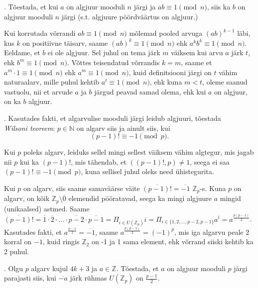 \documentclass[a4paper, 10pt]{article}
\newcommand{\Z}{\mathbb{Z}}
\newcommand{\N}{\mathbb{N}}
\newcommand{\w}{\overline}
\begin{document}
\bigskip

. T\~oestada, et kui $a$ on algjuur mooduli $n$ j\"argi ja $ab\equiv 1\pmod{n}$, siis ka $b$ on algjuur mooduli $n$ j\"argi (s.t. algjuure pöördväärtus on algjuur.)

\bigskip
Kui korrutada võrrandi $ab\equiv1\pmod n$ mõlemad pooled arvuga $(ab)^{k-1}$ läbi, kus $k$ on positiivne täisarv, saame $(ab)^k\equiv1\pmod n$ ehk $a^kb^k\equiv1\pmod n$. Eeldame, et $b$ ei ole algjuur. Sel juhul on tema järk $m$ väiksem kui arvu $a$ järk $t$, ehk $b^m\equiv1\pmod n$. Võttes teisendatud võrrandis $k=m$, saame et $a^m\cdot1\equiv1\pmod n$ ehk $a^m\equiv1\pmod n$, kuid definitsiooni järgi on $t$ vähim naturaalarv, mille puhul kehtib $a^t\equiv1\pmod n$, ehk kuna $m<t$, oleme saanud vastuolu, nii et arvude $a$ ja $b$ järgud peavad samad olema, ehk kui $a$ on algjuur, on ka $b$ algjuur.
\bigskip

. Kasutades fakti, et algarvulise mooduli järgi leidub algjuuri, tõestada \\\emph{Wilsoni teoreem}:
$p\in\N$ on algarv siis ja ainult siis, kui 
$$
(p-1)!\equiv -1 \pmod{p}.
$$

\smallskip
Kui $p$ poleks algarv, leiduks sellel mingi sellest väiksem vähim algtegur, mis jagab nii $p$ kui ka $(p-1)!$, mis tähendab, et $((p-1)!,p)\neq 1$, seega ei saa $(p-1)!\equiv -1 \pmod{p}$, kuna sellisel juhul oleks need ühistegurita. 

Kui $p$ on algarv, siis saame samaväärse väite $\w{(p-1)!}=\w{-1}$ $\Z_p$-s. Kuna $p$ on algarv, on kõik $\Z_p\setminus \w{0}$ elemendid pööratavad, seega ka mingi algjuure $a$ mingid (unikaalsed) astmed. Saame $\w{(p-1)!}=\w{1}\cdot \w{2}\cdot ...\cdot \w{p-2}\cdot \w{p-1}=\Pi_{i \in U(\Z_p)}i=\Pi_{i \in \{1,2,...,p-2,p-1\}} a^i=a^{\frac{p(p-1)}{2}} $. Kasutades fakti, et $a^{\frac{p-1}{2}}=\w{-1}$, saame $a^{\frac{p(p-1)}{2}}=(-1)^p $, mis iga algarvu peale 2 korral on $-1$, kuid ringis $\Z_2$ on -1 ja 1 sama element, ehk võrrand siiski kehtib ka 2 puhul.

\bigskip

. Olgu $p$ algarv kujul $4k+3$ ja $a\in\Z$. Tõestada, et $a$ on algjuur mooduli $p$ järgi parajasti siis, kui $\overline{-a}$ järk rühmas  $U(\Z_p)$ on $\frac{p-1}{2}$. 
\end{document}
